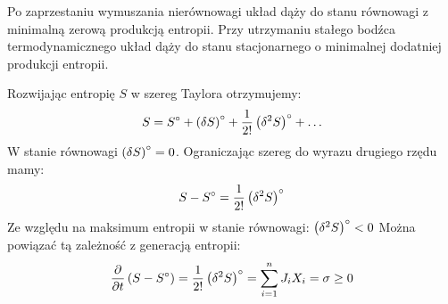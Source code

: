 \documentclass[10pt, a4paper, twoside, onecolumn]{article}
\numberwithin{equation}{section}
\begin{document}
	
	Po zaprzestaniu wymuszania nierównowagi układ dąży do stanu równowagi z minimalną zerową produkcją entropii. Przy utrzymaniu stałego bodźca termodynamicznego układ dąży do stanu stacjonarnego o minimalnej dodatniej produkcji entropii. \par
	Rozwijając entropię \(S\) w szereg Taylora otrzymujemy:
	\begin{equation}
		S = S^\circ + \left(\var{S}\right)^\circ + \frac{1}{2!}\left(\var^{2}S\right)^\circ + \ldots
	\end{equation}
	W stanie równowagi \(\left(\var{S}\right)^\circ=0\). Ograniczając szereg do wyrazu drugiego rzędu mamy:
	\begin{equation}
		S - S^\circ = \frac{1}{2!}\left(\var^{2}S\right)^\circ
	\end{equation}
	Ze względu na maksimum entropii w stanie równowagi: \(\left(\var^{2}S\right)^\circ<0\)
	Można powiązać tą zależność z generacją entropii: 
	\begin{equation}
		\pdv{t}\left(S - S^\circ\right) = \frac{1}{2!}\left(\var^{2}S\right)^\circ = \sum_{i=1}^{n}J_{i}X_{i}=\sigma\geq0
	\end{equation}
\end{document}
